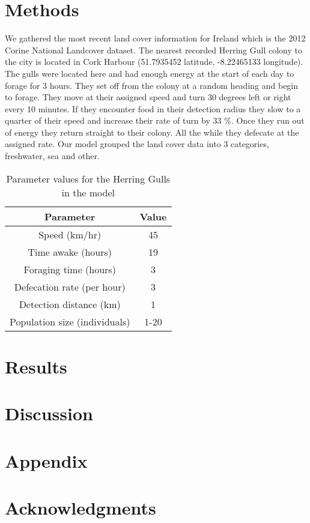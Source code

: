 \documentclass[a4paper,12pt]{article}
\begin{document}
\section*{Methods}
We gathered the most recent land cover information for Ireland which is the 2012 Corine National Landcover dataset.  
The nearest recorded Herring Gull colony to the city is located in Cork Harbour (51.7935452 latitude, -8.22465133 longitude). 
The gulls were located here and had enough energy at the start of each day to forage for 3 hours. 
They set off from the colony at a random heading and begin to forage. 
They move at their assigned speed and turn 30 degrees left or right every 10 minutes.
If they encounter food in their detection radius they slow to a quarter of their speed and increase their rate of turn by 33 \%.
Once they run out of energy they return straight to their colony. 
All the while they defecate at the assigned rate. 
Our model grouped the land cover data into 3 categories, freshwater, sea and other. 


\begin{table}[]
\centering
\caption{Parameter values for the Herring Gulls in the model}
\label{parameter-table}
\begin{tabular}{cc}
\hline
\textbf{Parameter}            & \textbf{Value} \\ \hline
Speed (km/hr)                 & 45             \\
Time awake (hours)            & 19             \\
Foraging time (hours)         & 3              \\
Defecation rate (per hour)    & 3              \\
Detection distance (km)       & 1              \\ 
Population size (individuals) & 1-20           \\ \hline
\end{tabular}
\end{table}

\section*{Results}

\section*{Discussion}


\section*{Appendix}

\section*{Acknowledgments}

\newpage



\end{document}
